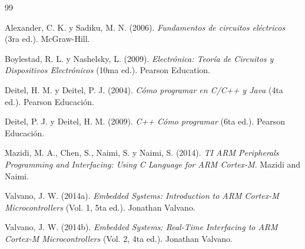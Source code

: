 \documentclass[11pt,a4paper]{article}
\begin{document}
\begin{thebibliography}{99}

Alexander, C. K. y Sadiku, M. N. (2006). \textit{Fundamentos de circuitos eléctricos} (3ra ed.). McGraw-Hill.

Boylestad, R. L. y Nashelsky, L. (2009). \textit{Electrónica: Teoría de Circuitos y Dispositivos Electrónicos} (10ma ed.). Pearson Education.

Deitel, H. M. y Deitel, P. J. (2004). \textit{Cómo programar en C/C++ y Java} (4ta ed.). Pearson Educación.

Deitel, P. J. y Deitel, H. M. (2009). \textit{C++ Cómo programar} (6ta ed.). Pearson Educación.

Mazidi, M. A., Chen, S., Naimi, S. y Naimi, S. (2014). \textit{TI ARM Peripherals Programming and Interfacing: Using C Language for ARM Cortex-M}. Mazidi and Naimi.

Valvano, J. W. (2014a). \textit{Embedded Systems: Introduction to ARM Cortex-M Microcontrollers} (Vol. 1, 5ta ed.). Jonathan Valvano.

Valvano, J. W. (2014b). \textit{Embedded Systems: Real-Time Interfacing to ARM Cortex-M Microcontrollers} (Vol. 2, 4ta ed.). Jonathan Valvano.

\end{thebibliography}
\end{document}
